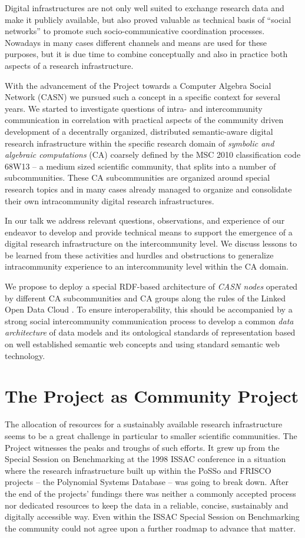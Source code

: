 \documentclass[11pt]{article}
\begin{document}
Digital infrastructures are not only well suited to exchange research data and
make it publicly available, but also proved valuable as technical basis of
``social networks'' to promote such socio-communicative coordination processes.
Nowadays in many cases different channels and means are used for these
purposes, but it is due time to combine conceptually and also in practice both
aspects of a research infrastructure.

With the advancement of the {\SD} Project towards a Computer Algebra Social
Network (CASN) we pursued such a concept in a specific context for several
years.  We started to investigate questions of intra- and intercommunity
communication in correlation with practical aspects of the community driven
development of a decentrally organized, distributed semantic-aware digital
research infrastructure within the specific research domain of \emph{symbolic
  and algebraic computations} (CA) coarsely defined by the MSC 2010
classification code 68W13 -- a medium sized scientific community, that splits
into a number of subcommunities.  These CA subcommunities are organized around
special research topics and in many cases already managed to organize and
consolidate their own intracommunity digital research infrastructures.

In our talk we address relevant questions, observations, and experience of our
endeavor to develop and provide technical means to support the emergence of a
digital research infrastructure on the intercommunity level.  We discuss
lessons to be learned from these activities and hurdles and obstructions to
generalize intracommunity experience to an intercommunity level within the CA
domain.  

We propose to deploy a special RDF-based architecture of \emph{CASN nodes}
operated by different CA subcommunities and CA groups along the rules of the
Linked Open Data Cloud \cite{lod}.  To ensure interoperability, this should be
accompanied by a strong social intercommunity communication process to develop
a common \emph{data architecture} of data models and its ontological standards
of representation based on well established semantic web concepts and using
standard semantic web technology.

\section{The {\SD} Project as Community Project}
The allocation of resources for a sustainably available research infrastructure
seems to be a great challenge in particular to smaller scientific communities.
The {\SD} Project witnesses the peaks and troughs of such efforts. It grew up
from the Special Session on Benchmarking at the 1998 ISSAC conference in a
situation where the research infrastructure built up within the PoSSo
\cite{PoSSo} and FRISCO \cite{FRISCO} projects -- the Polynomial Systems
Database -- was going to break down. After the end of the projects' fundings
there was neither a commonly accepted process nor dedicated resources to keep
the data in a reliable, concise, sustainably and digitally accessible way. Even
within the ISSAC Special Session on Benchmarking the community could not agree
upon a further roadmap to advance that matter.
\end{document}
